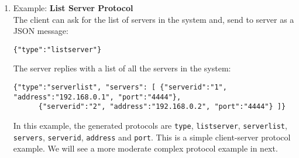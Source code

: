 \documentclass[dareport.tex]{subfiles}
\begin{document}
\begin{enumerate}[leftmargin=*]

\item Example: \textbf{List Server Protocol}
\\
The client can ask for the list of servers in the system and, send to server as a JSON message:
\begin{small}
\begin{verbatim}
{"type":"listserver"}
\end{verbatim}
\end{small}

The server replies with a list of all the servers in the system:
\begin{small}
\begin{verbatim}
{"type":"serverlist", "servers": [ {"serverid":"1", "address":"192.168.0.1", "port":"4444"}, 
      {"serverid":"2", "address":"192.168.0.2", "port":"4444"} ]}
\end{verbatim}
\end{small}
In this example, the generated protocols are \verb|type|, \verb|listserver|, \verb|serverlist|, \verb|servers|, \verb|serverid|, \verb|address| and \verb|port|. This is a simple client-server protocol example. We will see a more moderate complex protocol example in next.


\end{enumerate}
\end{document}
